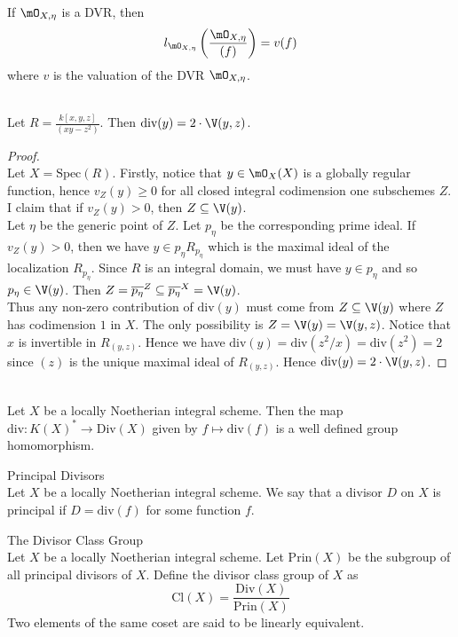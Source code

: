 \documentclass[a4paper]{article}
\begin{document}
If $\mO_{X,\eta}$ is a DVR, then $$l_{\mO_{X,\eta}}\left(\frac{\mO_{X,\eta}}{(f)}\right)=v(f)$$ where $v$ is the valuation of the DVR $\mO_{X,\eta}$. 

\begin{eg}{}{}\\
Let $R=\frac{k[x,y,z]}{(xy-z^2)}$. Then $\text{div}(y)=2\cdot\V(y,z)$. 
\begin{proof}\\
Let $X=\text{Spec}(R)$. Firstly, notice that $y\in\mO_X(X)$ is a globally regular function, hence $v_Z(y)\geq 0$ for all closed integral codimension one subschemes $Z$. I claim that if $v_Z(y)>0$, then $Z\subseteq\V(y)$. \\

Let $\eta$ be the generic point of $Z$. Let $p_\eta$ be the corresponding prime ideal. If $v_Z(y)>0$, then we have $y\in p_\eta R_{p_\eta}$ which is the maximal ideal of the localization $R_{p_\eta}$. Since $R$ is an integral domain, we must have $y\in p_\eta$ and so $p_\eta\in\V(y)$. Then $Z=\overline{p_\eta}^Z\subseteq\overline{p_\eta}^X=\V(y)$. \\

Thus any non-zero contribution of $\text{div}(y)$ must come from $Z\subseteq\V(y)$ where $Z$ has codimension $1$ in $X$. The only possibility is $Z=\V(y)=\V(y,z)$. Notice that $x$ is invertible in $R_{(y,z)}$. Hence we have $\text{div}(y)=\text{div}(z^2/x)=\text{div}(z^2)=2$ since $(z)$ is the unique maximal ideal of $R_{(y,z)}$. Hence $\text{div}(y)=2\cdot\V(y,z)$. 
\end{proof}
\end{eg}

\begin{lmm}{}{}\\
Let $X$ be a locally Noetherian integral scheme. Then the map $\text{div}:K(X)^\ast\to\text{Div}(X)$ given by $f\mapsto\text{div}(f)$ is a well defined group homomorphism. 
\end{lmm}

\begin{defn}{Principal Divisors}{}\\
Let $X$ be a locally Noetherian integral scheme. We say that a divisor $D$ on $X$ is principal if $D=\text{div}(f)$ for some function $f$. 
\end{defn}

\begin{defn}{The Divisor Class Group}{}\\
Let $X$ be a locally Noetherian integral scheme. Let $\text{Prin}(X)$ be the subgroup of all principal divisors of $X$. Define the divisor class group of $X$ as $$\text{Cl}(X)=\frac{\text{Div}(X)}{\text{Prin}(X)}$$ Two elements of the same coset are said to be linearly equivalent. 
\end{defn}
\end{document}
